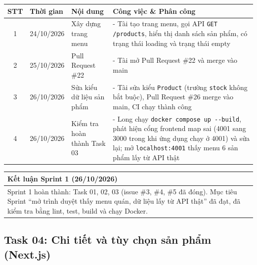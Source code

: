 \documentclass[12pt, a4paper]{article}
\begin{document}
\begin{tabularx}{\textwidth}{|c|p{3.2cm}|Y|Y|}
    \hline
    \textbf{STT} &
    \textbf{Thời gian} &
    \textbf{Nội dung} &
    \textbf{Công việc \& Phân công} \\
    \hline

    1 &
    24/10/2026 &
    Xây dựng trang menu &
    - Tài tạo trang menu, gọi API \texttt{GET /products}, hiển thị danh sách sản phẩm, có trạng thái loading và trạng thái empty \\
    \hline

    2 &
    25/10/2026 &
    Pull Request \#22 &
    - Tài mở Pull Request \#22 và merge vào main \\
    \hline

    3 &
    26/10/2026 &
    Sửa kiểu dữ liệu sản phẩm &
    - Tài sửa kiểu \texttt{Product} (trường \texttt{stock} không bắt buộc), Pull Request \#26 merge vào main, CI chạy thành công \\
    \hline

    4 &
    26/10/2026 &
    Kiểm tra hoàn thành Task 03 &
    - Long chạy \texttt{docker compose up -{}-build}, phát hiện cổng frontend map sai (4001 sang 3000 trong khi ứng dụng chạy ở 4001) và sửa lại; mở \texttt{localhost:4001} thấy menu 6 sản phẩm lấy từ API thật \\
    \hline
\end{tabularx}

\vspace{0.4cm}

\begin{tabularx}{\textwidth}{|Y|}
    \hline
    \textbf{Kết luận Sprint 1 (26/10/2026)} \\
    \hline
    Sprint 1 hoàn thành: Task 01, 02, 03 (issue \#3, \#4, \#5 đã đóng). Mục tiêu Sprint ``mở trình duyệt thấy menu quán, dữ liệu lấy từ API thật'' đã đạt, đã kiểm tra bằng lint, test, build và chạy Docker. \\
    \hline
\end{tabularx}

\vspace{0.8cm}

\subsection*{Task 04: Chi tiết và tùy chọn sản phẩm (Next.js)}
\end{document}
